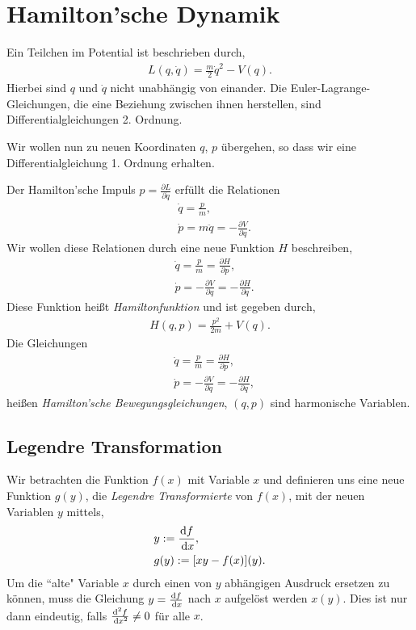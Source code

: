 \section{Hamilton'sche Dynamik}

Ein Teilchen im Potential ist beschrieben durch,
\begin{align*}
L(q,\dot{q}) = \frac{m}{2}\dot{q}^2 - V(q).
\end{align*}
Hierbei sind $q$ und $\dot{q}$ nicht unabhängig von einander. Die
Euler-Lagrange-Gleichungen, die eine Beziehung zwischen ihnen herstellen, sind
Differentialgleichungen 2. Ordnung.

Wir wollen nun zu neuen Koordinaten $q$, $p$ übergehen, so dass wir eine
Differentialgleichung 1. Ordnung erhalten.

Der Hamilton'sche Impuls $p=\frac{\partial L}{\partial \dot{q}}$ erfüllt die
Relationen
\begin{align*}
&\dot{q} = \frac{p}{m},\\
&\dot{p} = m\ddot{q} = -\frac{\partial V}{\partial q}.
\end{align*}
Wir wollen diese Relationen durch eine neue Funktion $H$ beschreiben,
\begin{align*}
&\dot{q} = \frac{p}{m} = \frac{\partial H}{\partial p},\\
&\dot{p} = -\frac{\partial V}{\partial q} = -\frac{\partial H}{\partial q}.
\end{align*}
Diese Funktion heißt \emph{Hamiltonfunktion} und ist gegeben durch,
\begin{align*}
H(q,p) = \frac{p^2}{2m} + V(q).
\end{align*}
Die Gleichungen
\begin{align*}
&\dot{q} = \frac{p}{m} = \frac{\partial H}{\partial p},\\
&\dot{p} = -\frac{\partial V}{\partial q} = -\frac{\partial H}{\partial q},
\end{align*}
heißen \emph{Hamilton'sche Bewegungsgleichungen}, $(q,p)$ sind harmonische
Variablen.

\subsection{Legendre Transformation}

Wir betrachten die Funktion $f(x)$ mit Variable $x$ und definieren uns eine
neue Funktion $g(y)$, die \emph{Legendre Transformierte} von $f(x)$, mit der
neuen Variablen $y$ mittels,
\begin{align*}
&y := \frac{\mathrm{d} f}{\,\mathrm{d} x},\\
&g(y) := [xy-f(x)](y).
\end{align*}
Um die ``alte" Variable $x$ durch einen von $y$ abhängigen Ausdruck ersetzen zu
können, muss die Gleichung $y = \frac{\mathrm{d} f}{\,\mathrm{d} x}$ nach $x$ aufgelöst
werden $x(y)$. Dies ist nur dann eindeutig, falls $\frac{\mathrm{d}^2
f}{\,\mathrm{d} x^2}\neq 0$ für alle $x$.

